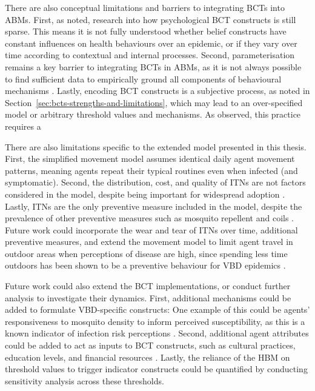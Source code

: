 There are also conceptual limitations and barriers to integrating BCTs into ABMs. First, as \citet{durham_incorporating_2012} noted, research into how psychological BCT constructs  is still sparse. This means it is not fully understood whether belief constructs have constant influences on health behaviours over an epidemic, or if they vary over time according to contextual and internal processes. Second, parameterisation remains a key barrier to integrating BCTs in ABMs, as it is not always possible to find sufficient data to empirically ground all components of behavioural mechanisms \cite{durham_incorporating_2012, scheidegger_agent-based_2017}. Lastly, encoding BCT constructs is a subjective process, as noted in Section~\ref{sec:bcts-strengths-and-limitations}, which may lead to an over-specified model or arbitrary threshold values and mechanisms. As \citet{durham_incorporating_2012} observed, this practice requires a 

There are also limitations specific to the extended model presented in this thesis. First, the simplified movement model assumes identical daily agent movement patterns, meaning agents repeat their typical routines even when infected (and symptomatic). Second, the distribution, cost, and quality of ITNs are not factors considered in the model, despite being important for widespread adoption \cite{manuv_investigating_2023}. Lastly, ITNs are the only preventive measure included in the model, despite the prevalence of other preventive measures such as mosquito repellent and coils \cite{phok_behavioural_2022}. Future work could incorporate the wear and tear of ITNs over time, additional preventive measures, and extend the movement model to limit agent travel in outdoor areas when perceptions of disease are high, since spending less time outdoors has been shown to be a preventive behaviour for VBD epidemics \cite{duval_how_2022}.

Future work could also extend the BCT implementations, or conduct further analysis to investigate their dynamics. First, additional mechanisms could be added to formulate VBD-specific constructs: One example of this could be agents' responsiveness to mosquito density to inform perceived susceptibility, as this is a known indicator of infection risk perceptions \cite{raude_public_2012}. Second, additional agent attributes could be added to act as inputs to BCT constructs, such as cultural practices, education levels, and financial resources \cite{watanabe_determinants_2014, naserrudin_role_2022}. Lastly, the reliance of the HBM on threshold values to trigger indicator constructs could be quantified by conducting sensitivity analysis across these thresholds.

